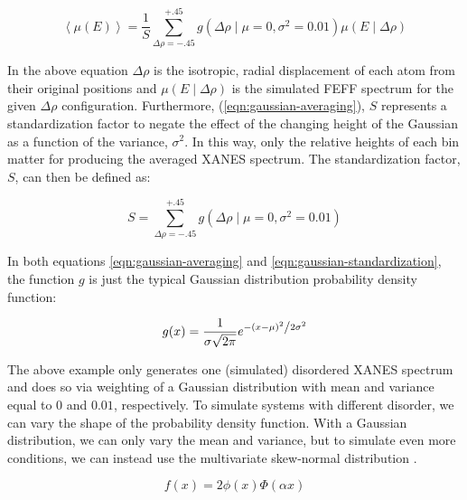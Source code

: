 \begin{equation}
	\label{eqn:gaussian-averaging}
	\left\langle \mu(E) \right\rangle  = \frac{1}{S} \sum_{\Delta\rho=-.45}^{+.45} g\left(\Delta \rho \mid \mu=0, \sigma^2=0.01\right) \mu(E \mid \Delta\rho)
\end{equation}

\noindent
In the above equation $ \Delta\rho $ is the isotropic, radial displacement of each atom from their original positions and $ \mu(E \mid \Delta\rho) $ is the simulated FEFF spectrum for the given $ \Delta\rho $ configuration. Furthermore, (\ref{eqn:gaussian-averaging}), $ S $ represents a standardization factor to negate the effect of the changing height of the Gaussian as a function of the variance, $ \sigma^2 $. In this way, only the relative heights of each bin matter for producing the averaged XANES spectrum. The standardization factor, $ S $, can then be defined as:

\begin{equation}
	\label{eqn:gaussian-standardization}
	S = \sum_{\Delta\rho=-.45}^{+.45} g\left(\Delta \rho \mid \mu=0, \sigma^2=0.01\right)
\end{equation}

\noindent
In both equations \ref{eqn:gaussian-averaging} and \ref{eqn:gaussian-standardization}, the function $ g $ is just the typical Gaussian distribution probability density function: 

\begin{equation}
	\label{eqn:gaussian}
	g(x) = \frac{1}{{\sigma \sqrt {2\pi } }}e^{{{ - \left( {x - \mu } \right)^2 } \mathord{\left/ {\vphantom {{ - \left( {x - \mu } \right)^2 } {2\sigma ^2 }}} \right. \kern-\nulldelimiterspace} {2\sigma ^2 }}}
\end{equation}

The above example only generates one (simulated) disordered XANES spectrum and does so via weighting of a Gaussian distribution with mean and variance equal to $ 0 $ and $ 0.01 $, respectively. To simulate systems with different disorder, we can vary the shape of the probability density function. With a Gaussian distribution, we can only vary the mean and variance, but to simulate even more conditions, we can instead use the multivariate skew-normal distribution \cite{skewnorm_Azzalini_1999}.

\begin{equation}
	\label{eqn:skew-norm}
	f(x)=2\phi (x)\Phi (\alpha x)
\end{equation}


